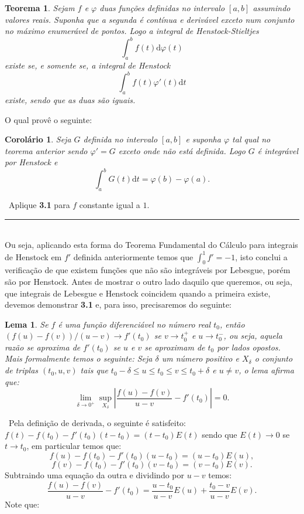\documentclass[12pt, a4paper]{article}
\newtheorem{lem}[mydef]{Lema}
\newtheorem{thrm}[mydef]{Teorema}
\newtheorem{cor}[mydef]{Corolário}
\def\dem{\par\smallbreak\noindent {\textit{ Demonstração:}} \ }
\def\eop{\hfill\rule{2.5mm}{2.5mm}}
\theoremstyle{definition}
\begin{document}
\begin{thrm}
	
	Sejam $f$ e $\varphi$ duas funções definidas no intervalo $[a,b]$ assumindo valores reais. Suponha que a segunda é contínua e derivável exceto num conjunto no máximo enumerável de pontos. Logo a integral de Henstock-Stieltjes $$\int_a^b f(t) \text{d}\varphi (t)$$ existe se, e somente se, a integral de Henstock $$\int_a^b f(t)\varphi' (t) \text{d}t$$ existe, sendo que as duas são iguais.
	
\end{thrm}

O qual provê o seguinte: 

\begin{cor}
	
	Seja $G$ definida no intervalo $[a,b]$ e suponha $\varphi$ tal qual no teorema anterior sendo $\varphi '=G$ exceto onde não está definida. Logo $G$ é integrável por Henstock e $$\int_a^b G(t) \text{d}t=\varphi(b)-\varphi(a).$$ 
	
\end{cor}

\dem Aplique \textbf{3.1} para $f$ constante igual a $1$. \eop  \\

Ou seja, aplicando esta forma do Teorema Fundamental do Cálculo para integrais de Henstock em $f'$ definida anteriormente temos que $\int_0^1 f'=-1$, isto conclui a verificação de que existem funções que não são integráveis por Lebesgue, porém são por Henstock. Antes de mostrar o outro lado daquilo que queremos, ou seja, que integrais de Lebesgue e Henstock coincidem quando a primeira existe, devemos demonstrar \textbf{3.1} e, para isso, precisaremos do seguinte: 

\begin{lem}
	
	Se $f$ é uma função diferenciável no número real $t_0$, então $(f(u)-f(v))/(u-v)\rightarrow f'(t_0)$ se $v\rightarrow t_0^{+}$ e $u\rightarrow t_0^{-}$, ou seja, aquela razão se aproxima de $f'(t_0)$ se $u$ e $v$ se aproximam de $t_0$ por lados opostos. Mais formalmente temos o seguinte: Seja $\delta$ um número positivo e $X_\delta$ o conjunto de triplas $(t_0,u,v)$ tais que $t_0-\delta\leq u\leq t_0 \leq v \leq t_0 +\delta$ e $u\neq v$, o lema afirma que: $$\lim_{\delta\rightarrow 0^{+}} \sup_{X_\delta} \left| \frac{f(u)-f(v)}{u-v} - f'(t_0) \right|=0.$$
	
\end{lem}

\dem Pela definição de derivada, o seguinte é satisfeito: $f(t)-f(t_0)-f'(t_0)(t-t_0)=(t-t_0)E(t)$ sendo que $E(t)\rightarrow 0$ se $t\rightarrow t_0$, em particular temos que: $$f(u)-f(t_0)-f'(t_0)(u-t_0)=(u-t_0)E(u),$$ $$f(v)-f(t_0)-f'(t_0)(v-t_0)=(v-t_0)E(v).$$ Subtraindo uma equação da outra e dividindo por $u-v$ temos: $$\frac{f(u)-f(v)}{u-v} - f'(t_0) = \frac{u-t_0}{u-v}E(u)+\frac{t_0-v}{u-v}E(v).$$ Note que:
\end{document}
